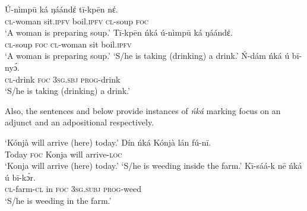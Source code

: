 \documentclass[output=paper,colorlinks,citecolor=brown]{langscibook}
\begin{document}
\ea%
    \label{ex:bisilki:13}
    \ea\label{ex:bisilki:13a}
    \gll    Ú-nìmpū	ká		ŋáándέ	tī-kpēn	nέ.\\
            \textsc{cl-}woman	sit\textsc{.ipfv}	boil\textsc{.ipfv}	\textsc{cl-}soup	\textsc{foc}\\
    \glt    ‘A woman is preparing soup.’
    \ex\label{ex:bisilki:13b}
    \gll    Tī-kpēn	ńká	ú-nìmpū	ká	ŋáándέ.\\
            \textsc{cl-}soup	\textsc{foc}	\textsc{cl-}woman	sit	boil\textsc{.ipfv}\\
    \glt    ‘A woman is preparing soup.’
    \jambox*{[canonical]}
    \glt    ‘S/he is taking (drinking) a drink.’
    \ex\label{ex:bisilki:13d}
    \gll    Ń-dám	ńká	ú		bī-nyɔ́.\\
            \textsc{cl-}drink	\textsc{foc}	\textsc{3sg.sbj}	\textsc{prog-}drink\\
    \glt    ‘S/he is taking (drinking) a drink.’
    \z
\z

Also, the sentences  and  below provide instances of \textit{ńká }marking focus on an adjunct and an adpositional respectively.

\ea%
    \label{ex:bisilki:14}
    \jambox*{[canonical]}
    \glt    ‘Kónjà will arrive (here) today.’
    \ex\label{ex:bisilki:14b}
    \gll    Dín		ńká	Kónjà		lán	fú-nī.\\
            Today		\textsc{foc}	Konja		will	arrive-\textsc{loc}\\
    \glt    ‘Konja will arrive (here) today.’
    \glt    ‘S/he is weeding inside the farm.’
    \ex\label{ex:bisilki:14d}
    \gll    Kī-sáá-k	nē	ńká	ú		bī-kɔ́r.\\
            \textsc{cl-}farm\textsc{-cl}	in	\textsc{foc}	\textsc{3sg.subj}	\textsc{prog-}weed\\
    \glt    ‘S/he is weeding in the farm.’
    \z
\z
\end{document}
